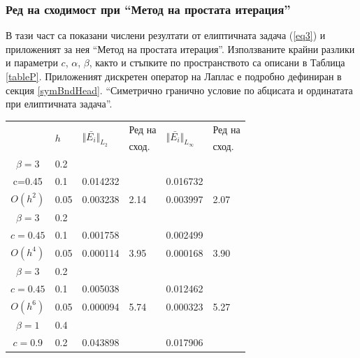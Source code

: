 \documentclass[a4paper]{article}
\newcommand{\rf}[1]{(\ref{#1})}
\theoremstyle{remark}
\begin{document}
\subsubsection{Ред на сходимост при ``Метод на простата итерация''}\label{validation}
В тази част са показани числени резултати от елиптичната задача \rf{eq3} и приложеният за нея ``Метод на простата итерация''. Използваните крайни разлики и параметри $c$, $\alpha$, $\beta$, както и стъпките по пространството са описани в Таблица \ref{tableP}. Приложеният дискретен оператор на Лаплас е подробно дефиниран в секция \ref{symBndHead}. ``Симетрично гранично условие по абцисата и ординатата при елиптичната задача''.

\begin{table}[ht]
\centering
		\begin{tabular}{||c|l|ll|ll||}
			\hline
			\hline
      \multirow{2  }{*}{ }        & \multirow{2  }{*}{$h$}  &  	\multirow{2  }{*}{ $\Vert \bar{ E_i} \Vert_{L_2}$ }	&Ред на	& \multirow{2  }{*}{ $\Vert \bar{ E_i} \Vert_{L_\infty}$ } 		&Ред на   \\
	                                        &                                                & 							 					&  сход. 	& 								       					& сход. \\
   					\hline 
					\hline 
$\beta = 3$   	&0.2    										&            &            &           &   \\
      c=0.45 	&0.1    & 0.014232  						&            & 0.016732 			&   \\
   $O(h^2)$     &0.05   & 0.003238  						&2.14  & 0.003997					& 2.07 \\
\hline 
$\beta = 3$   	&0.2   &            &            &             &    \\
      $c=0.45 $ &0.1   &   0.001758   &           &  0.002499  &   \\
       $O(h^4)$	&0.05  &  0.000114 & 3.95    & 0.000168  & 3.90  \\
\hline
$\beta = 3$   	&0.2   &            &        &                  &      \\
   $c=0.45$   	&0.1   &  0.005038 &           & 0.012462       &       \\
     $O(h^6)$	&0.05  &  0.000094  & 5.74  &  0.000323 & 5.27         \\
			\hline
			\hline 	
$\beta = 1$   	&0.4   &             &           &                & \\
     $c=0.9$     &0.2   &  0.043898  &             & 0.017906      &    \\

\end{tabular}
\end{table}
\end{document}
